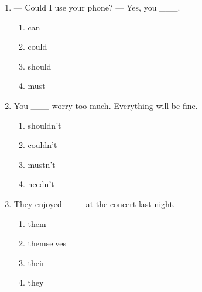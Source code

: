 \documentclass[11pt,a4paper]{ctexart}
\begin{document}
\begin{enumerate}[leftmargin=*,itemsep=4pt]
\begin{enumerate}[label=\Alph*.,leftmargin=2em,itemsep=1pt,topsep=2pt]
\end{enumerate}
\item — Could I use your phone? — Yes, you \_\_\_.
\begin{enumerate}[label=\Alph*.,leftmargin=2em,itemsep=1pt,topsep=2pt]
\item can
\item could
\item should
\item must
\end{enumerate}
\item You \_\_\_ worry too much. Everything will be fine.
\begin{enumerate}[label=\Alph*.,leftmargin=2em,itemsep=1pt,topsep=2pt]
\item shouldn’t
\item couldn’t
\item mustn’t
\item needn’t
\end{enumerate}
\item They enjoyed \_\_\_ at the concert last night.
\begin{enumerate}[label=\Alph*.,leftmargin=2em,itemsep=1pt,topsep=2pt]
\item them
\item themselves
\item their
\item they
\end{enumerate}
\end{enumerate}

\newpage
\end{document}
